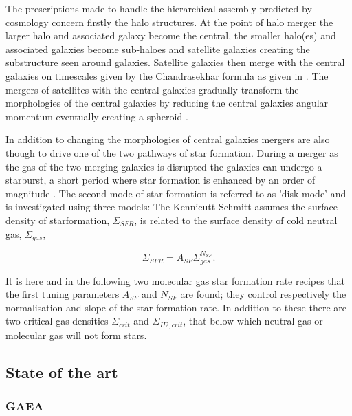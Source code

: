 The prescriptions made to handle the hierarchical assembly predicted by \LCDM cosmology concern firstly the halo structures. At the point of halo merger the larger halo and associated galaxy become the central, the smaller halo(es) and associated galaxies become sub-haloes and satellite galaxies creating the substructure seen around galaxies. Satellite galaxies then merge with the central galaxies on timescales given by the Chandrasekhar formula \citep{Chandrasekhar1943DYNAMICALFRICTION} as given in \citet{Boylan-Kolchin2008}. The mergers of satellites with the central galaxies gradually transform the morphologies of the central galaxies by reducing the central galaxies angular momentum eventually creating a spheroid \cite{Hopkins2009HOWMERGERS}. 

In addition to changing the morphologies of central galaxies mergers are also though to drive one of the two pathways of star formation. During a merger as the gas of the two merging galaxies is disrupted the galaxies can undergo a starburst, a short period where star formation is enhanced by an order of magnitude \citep{Hopkins2009HOWMERGERS}. The second mode of star formation is referred to as 'disk mode' and is investigated using three models: The Kennicutt Schmitt \citep{KennicuttJr.1998TheGalaxies} assumes the surface density of starformation, $\Sigma_{SFR}$, is related to the surface density of cold neutral gas, $\Sigma_{gas}$, 

\begin{equation}
    \Sigma_{SFR} = A_{SF}\Sigma_{gas}^{N_{SF}}.
\end{equation}

It is here and in the following two molecular gas star formation rate recipes that the first tuning parameters $A_{SF}$ and $N_{SF}$ are found; they control respectively the normalisation and slope of the star formation rate. In addition to these there are two critical gas densities $\Sigma_{crit}$ and $\Sigma_{H2,crit}$, that below which neutral gas or molecular gas will not form stars. 

\subsection{State of the art}
\subsubsection{GAEA}


